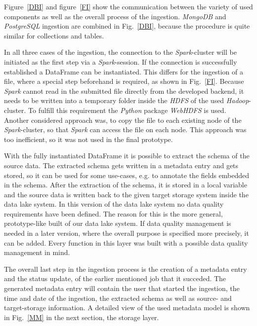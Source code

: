 \documentclass[conference]{IEEEtran}
\begin{document}
Figure~\ref{DBI} and figure~\ref{FI} show the communication between the variety of used 
components as well as the overall process of the ingestion. 
\textit{MongoDB} and \textit{PostgreSQL} ingestion are combined in Fig.~\ref{DBI}, because the procedure is quite 
similar for collections and tables.

In all three cases of the ingestion, the connection to the \textit{Spark}-cluster will be initiated
as the first step via a \textit{Spark}-session. 
If the connection is successfully established a DataFrame can be instantiated. 
This differs for the ingestion of a file, where a special step beforehand is required, as shown in 
Fig.~\ref{FI}.
Because \textit{Spark} cannot read in the submitted file directly from the developed backend, it 
needs to be written into a temporary folder inside the \textit{HDFS} of the used \textit{Hadoop}-cluster. 
To fulfill this requirement the \textit{Python} package \textit{WebHDFS} is used.
Another considered approach was, to copy the file to each existing node of the 
\textit{Spark}-cluster, so that \textit{Spark} can access the file on each node. 
This approach was too inefficient, so it was not used in the final prototype.

With the fully instantiated DataFrame it is possible to extract the schema of the source data. 
The extracted schema gets written in a metadata entry and gets stored, so it can be used for some 
use-cases, e.g. to annotate the fields embedded in the schema. 
After the extraction of the schema, it is stored in a local variable and the source data is 
written back to the given target storage system inside the data lake system. 
In this version of the data lake system no data quality requirements have been defined. 
The reason for this is the more general, prototype-like built of our data lake system. 
If data quality management is needed in a later version, where the overall purpose is specified
more precisely, it can be added. 
Every function in this layer was built with a possible data quality management in mind. 

The overall last step in the ingestion process is the creation of a metadata entry and the status 
update, of the earlier mentioned job that it succeded. 
The generated metadata entry will contain the user that started the ingestion, the time and date of
the ingestion, the extracted schema as well as source- and target-storage information. 
A detailed view of the used metadata model is shown in Fig.~\ref{MM} in the next section, the 
storage layer.
\end{document}
